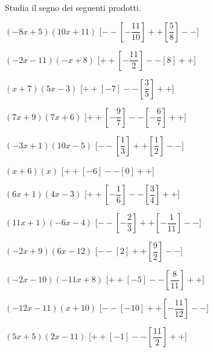 \begin{esercizio}\label{ese:dis_5}
 Studia il segno dei seguenti prodotti.
 \begin{enumeratea}
  \item  $\left(-8 x +5\right)\left(10 x +11\right)$ \hfill 
  [$--\left [-\dfrac{11}{10} \right ]++\left [\dfrac{5}{8} \right ]--$]
  \item  $\left(-2 x -11\right)\left(- x +8\right)$ \hfill 
  [$++\left [-\dfrac{11}{2} \right ]--\left [8 \right ]++$]
  \item  $\left(x +7\right)\left(5 x -3\right)$ \hfill 
  [$++\left [-7 \right ]--\left [\dfrac{3}{5} \right ]++$]
  \item  $\left(7 x +9\right)\left(7 x +6\right)$ \hfill 
  [$++\left [-\dfrac{9}{7} \right ]--\left [-\dfrac{6}{7} \right ]++$]
  \item  $\left(-3 x +1\right)\left(10 x -5\right)$ \hfill 
  [$--\left [\dfrac{1}{3} \right ]++\left [\dfrac{1}{2} \right ]--$]
  \item  $\left(x +6\right)\left(x \right)$ \hfill 
  [$++\left [-6 \right ]--\left [0 \right ]++$]
  \item  $\left(6 x +1\right)\left(4 x -3\right)$ \hfill 
  [$++\left [-\dfrac{1}{6} \right ]--\left [\dfrac{3}{4} \right ]++$]
  \item  $\left(11 x +1\right)\left(-6 x -4\right)$ \hfill 
  [$--\left [-\dfrac{2}{3} \right ]++\left [-\dfrac{1}{11} \right ]--$]
  \item  $\left(-2 x +9\right)\left(6 x -12\right)$ \hfill 
  [$--\left [2 \right ]++\left [\dfrac{9}{2} \right ]--$]
  \item  $\left(-2 x -10\right)\left(-11 x +8\right)$ \hfill 
  [$++\left [-5 \right ]--\left [\dfrac{8}{11} \right ]++$]
  \item  $\left(-12 x -11\right)\left(x +10\right)$ \hfill 
  [$--\left [-10 \right ]++\left [-\dfrac{11}{12} \right ]--$]
  \item  $\left(5 x +5\right)\left(2 x -11\right)$ \hfill 
  [$++\left [-1 \right ]--\left [\dfrac{11}{2} \right ]++$]
 \end{enumeratea}
\end{esercizio}

